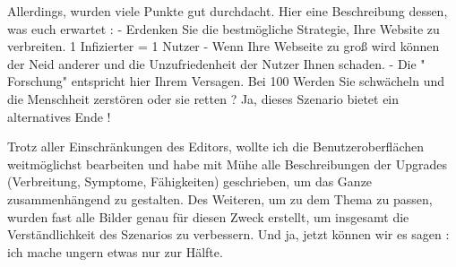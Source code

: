 Allerdings, wurden viele Punkte gut durchdacht. Hier eine Beschreibung dessen, was euch erwartet :
- Erdenken Sie die bestmögliche Strategie, Ihre Website zu verbreiten. 1 Infizierter = 1 Nutzer
- Wenn Ihre Webseite zu groß wird können der Neid anderer und die Unzufriedenheit der Nutzer Ihnen schaden.
- Die " Forschung" entspricht hier Ihrem Versagen. Bei 100%
Werden Sie schwächeln und die Menschheit zerstören oder sie retten ? Ja, dieses Szenario bietet ein alternatives Ende !

Trotz aller Einschränkungen des Editors, wollte ich die Benutzeroberflächen weitmöglichst bearbeiten und habe mit Mühe alle Beschreibungen der Upgrades (Verbreitung, Symptome, Fähigkeiten) geschrieben, um das Ganze zusammenhängend zu gestalten. Des Weiteren, um zu dem Thema zu passen, wurden fast alle Bilder genau für diesen Zweck erstellt, um insgesamt die Verständlichkeit des Szenarios zu verbessern. Und ja, jetzt können wir es sagen : ich mache ungern etwas nur zur Hälfte.